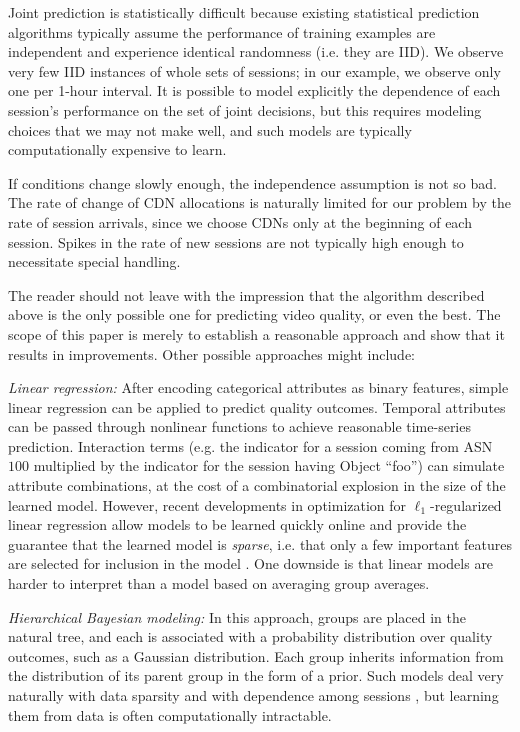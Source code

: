 Joint prediction is statistically difficult because existing statistical prediction algorithms typically assume the performance of training examples are independent and experience identical randomness (i.e. they are IID).  We observe very few IID instances of whole sets of sessions; in our example, we observe only one per 1-hour interval.  It is possible to model explicitly the dependence of each session’s performance on the set of joint decisions, but this requires modeling choices that we may not make well, and such models are typically computationally expensive to learn. \fillme

If conditions change slowly enough, the independence assumption is not so bad.
The rate of change of CDN allocations is naturally limited for our problem by the rate of session arrivals, since we choose CDNs only at the beginning of each session.  Spikes in the rate of new sessions are not typically high enough to necessitate special handling.  

The reader should not leave with the impression that the algorithm described above is the only possible one for predicting video quality, or even the best.  The scope of this paper is merely to establish a reasonable approach and show that it results in improvements.  Other possible approaches might include:
\begin{packedenumerate}
  \item \emph{Linear regression:} After encoding categorical attributes as binary features, simple linear regression can be applied to predict quality outcomes.  Temporal attributes can be passed through nonlinear functions to achieve reasonable time-series prediction.  Interaction terms (e.g. the indicator for a session coming from ASN $100$ multiplied by the indicator for the session having Object ``foo'') can simulate attribute combinations, at the cost of a combinatorial explosion in the size of the learned model.  However, recent developments in optimization for $\ell_1$-regularized linear regression allow models to be learned quickly online and provide the guarantee that the learned model is \emph{sparse}, i.e. that only a few important features are selected for inclusion in the model \cite{duchi2010composite}.  One downside is that linear models are harder to interpret than a model based on averaging group averages.
  \item \emph{Hierarchical Bayesian modeling:} In this approach, groups are placed in the natural tree, and each is associated with a probability distribution over quality outcomes, such as a Gaussian distribution.  Each group inherits information from the distribution of its parent group in the form of a prior.  Such models deal very naturally with data sparsity and with dependence among sessions \cite{gelman2003bayesian}, but learning them from data is often computationally intractable.
\end{packedenumerate}